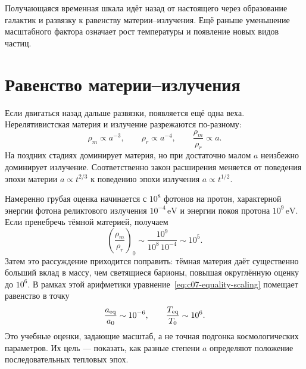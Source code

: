 \begin{classroomqa}
\end{classroomqa}

Получающаяся временная шкала идёт назад от настоящего через образование галактик и развязку к равенству материи--излучения. Ещё раньше уменьшение масштабного фактора означает рост температуры и появление новых видов частиц.

\section{Равенство материи--излучения}

Если двигаться назад дальше развязки, появляется ещё одна веха. Нерелятивистская материя и излучение разрежаются по-разному:
\begin{equation}
\rho_m\propto a^{-3},
\qquad
\rho_r\propto a^{-4},
\qquad
\frac{\rho_m}{\rho_r}\propto a.
\label{eq:c07-equality-scaling}
\end{equation}
На поздних стадиях доминирует материя, но при достаточно малом \(a\) неизбежно доминирует излучение. Соответственно закон расширения меняется от поведения эпохи материи \(a\propto t^{2/3}\) к поведению эпохи излучения \(a\propto t^{1/2}\).

Намеренно грубая оценка начинается с \(10^8\) фотонов на протон, характерной энергии фотона реликтового излучения \(10^{-4}\,\mathrm{eV}\) и энергии покоя протона \(10^9\,\mathrm{eV}\). Если пренебречь тёмной материей, получаем
\begin{equation}
\left(\frac{\rho_m}{\rho_r}\right)_0
\sim
\frac{10^9}{10^8\,10^{-4}}
\sim10^5.
\end{equation}
Затем это рассуждение приходится поправить: тёмная материя даёт существенно больший вклад в массу, чем светящиеся барионы, повышая округлённую оценку до \(10^6\). В рамках этой арифметики уравнение~\eqref{eq:c07-equality-scaling} помещает равенство в точку
\begin{equation}
\frac{a_{\rm eq}}{a_0}\sim10^{-6},
\qquad
\frac{T_{\rm eq}}{T_0}\sim10^6.
\label{eq:c07-equality-estimate}
\end{equation}
Это учебные оценки, задающие масштаб, а не точная подгонка космологических параметров. Их цель — показать, как разные степени \(a\) определяют положение последовательных тепловых эпох.

